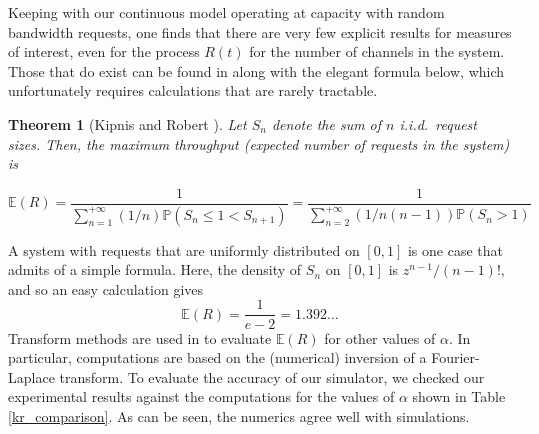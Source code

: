 \documentclass{amsart}
\def\P{\mathbb{P}}
\newtheorem{theorem}{Theorem}
\begin{document}
Keeping with our continuous model operating at capacity
with random bandwidth requests, one finds that
there are very few explicit results for measures of interest, even
for the process $R(t)$ for the number of channels in the system. Those that do
exist can be found in \cite{KipnisR1990} along with the elegant
formula below, which unfortunately requires calculations that are
rarely tractable.


\begin{theorem}[Kipnis and Robert \cite{KipnisR1990}]
Let $S_n$ denote the sum of $n$
i.i.d.\ request sizes. Then, the maximum throughput (expected number of requests in the system) is

\[
{\mathbb{E}}(R)  =  {\frac{1}{ \sum_{n=1}^{+ \infty} (1/n) \P (S_n \leq 1 <
S_{n+1})} } =  {\frac{1}{\sum_{n=2}^{+ \infty} (1/n(n-1)) \P (S_n > 1)} }
\]

\end{theorem}

A system with requests that are uniformly distributed on $[0,1]$ is one case that admits of a simple
formula. Here, the density of $S_n$ on $[0,1]$ is $z^{n-1}/(n-1)!$,
and so an easy calculation gives
$$ {\mathbb{E}}(R) = \frac{1}{ e - 2} = 1.392\ldots $$
Transform methods are used in \cite{KipnisR1990} to evaluate ${\mathbb{E}}(R)$
for other values of $\alpha$. In particular, computations are based
on the (numerical) inversion of a Fourier-Laplace transform. To evaluate the
accuracy of our simulator, we checked our experimental results
against the computations  for the values of $\alpha$ shown in Table
\ref{kr_comparison}.  As can be seen, the numerics agree well with
simulations.
\end{document}
